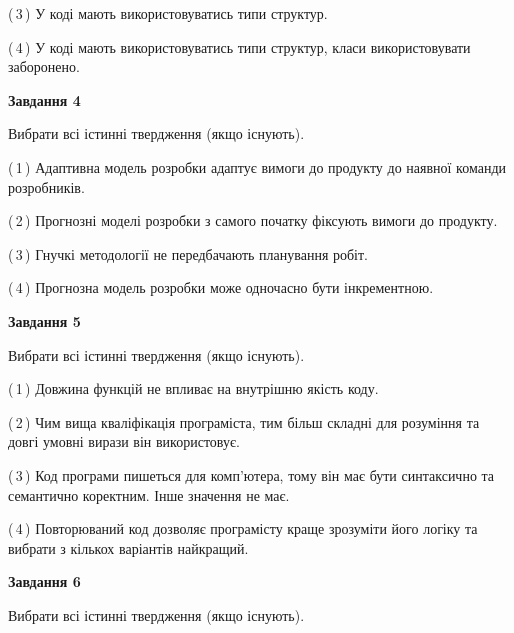 \documentclass[10pt, ukrainian]{article}
\begin{document}
{\begin {large}
(\,3\,) У коді мають використовуватись типи структур. %



(\,4\,) У коді мають використовуватись типи структур, класи використовувати заборонено. %


{\begin {center}\textbf{Завдання 4}\end {center}}\par
Вибрати всі істинні твердження (якщо існують).\par
\vspace{2mm}



(\,1\,) Адаптивна модель розробки адаптує вимоги до продукту до наявної команди розробників. %



(\,2\,) Прогнозні моделі розробки з самого початку фіксують вимоги до продукту. %



(\,3\,) Гнучкі методології не передбачають планування робіт. %



(\,4\,) Прогнозна модель розробки може одночасно бути інкрементною. %


{\begin {center}\textbf{Завдання 5}\end {center}}\par
Вибрати всі істинні твердження (якщо існують).\par
\vspace{2mm}



(\,1\,) Довжина функцій не впливає на внутрішню якість коду. %



(\,2\,) Чим вища кваліфікація програміста, тим більш складні для розуміння та довгі умовні вирази він використовує. %



(\,3\,) Код програми пишеться для комп'ютера, тому він має бути синтаксично та семантично коректним. Інше значення не має. %



(\,4\,) Повторюваний код дозволяє програмісту краще зрозуміти його логіку та вибрати з кількох варіантів найкращий. %

\newpage

{\begin {center}\textbf{Завдання 6}\end {center}}\par
Вибрати всі істинні твердження (якщо існують).\par
\vspace{2mm}




\end{large}}
\end{document}
